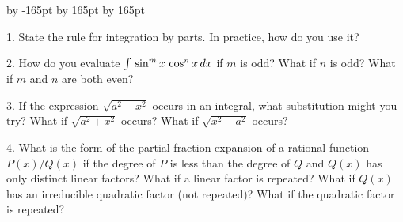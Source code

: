 \documentclass{sebase}
\begin{document}
\vspace*{-9pt}%
\setlength{\columnsep}{24pt}
\advance \leftskip by -165pt
\advance\hsize by 165pt
\advance\linewidth by 165pt
\begin{multicols}{2}%

\begin{ExerciseList}
\item[\hfill 1.] State the rule for integration by parts. In practice, how
do you use it?

%

\item[\hfill 2.] How do you evaluate $\textstyle \int \,\sin ^{m}x\,\cos ^{n}x\,dx$ if 
$m$ is odd? What if $n$ is odd? What if $m$ and $n$ are both even?

%

\item[\hfill 3.] If the expression $\sqrt{a^{2}-x^{2}}$ occurs in an
integral, what substitution might you try? What if $\sqrt{a^{2}+x^{2}}$
occurs? What if $\sqrt{x^{2}-a^{2}}$ occurs?

%

\item[\hfill 4.] What is the form of the partial fraction expansion of a
rational function $P\left( x\right) /Q\left( x\right) $ if the degree of $P$
is less than the degree of $Q$ and $Q\left( x\right) $ has only distinct
linear factors? What if a linear factor is repeated? What if $Q\left(
x\right) $ has an irreducible quadratic factor (not repeated)? What if the
quadratic factor is repeated?

%


\end{ExerciseList}
\end{multicols}
\end{document}
